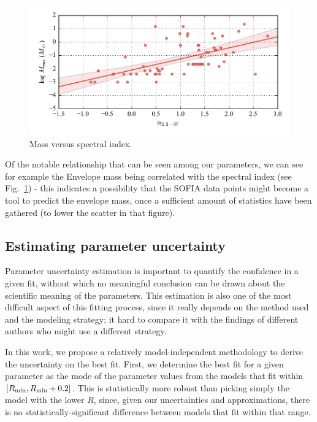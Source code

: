 \begin{figure}[!h]
\begin{center}
\includegraphics[width=\textwidth]{Figures/massVSalpha.pdf}
\vspace{-1cm}
\caption[Mass versus spectral index]{Mass versus spectral index.}
\label{fig:massVSalpha}
\end{center}
\end{figure}

Of the notable relationship that can be seen among our parameters, we can see for example the Envelope mass being correlated with the spectral index (see Fig.~\ref{fig:massVSalpha}) - this indicates a possibility that the SOFIA data points might become a tool to predict the envelope mass, once a sufficient amount of statistics have been gathered (to lower the scatter in that figure). 



\subsection{Estimating parameter uncertainty}

Parameter uncertainty estimation is important to quantify the confidence in a given fit, without which no meaningful conclusion can be drawn about the scientific meaning of the parameters. This estimation is also one of the most difficult aspect of this fitting process, since it really depends on the method used and the modeling strategy; it hard to compare it with the findings of different authors who might use a different strategy. 

In this work, we propose a relatively model-independent methodology to derive the uncertainty on the best fit. First, we determine the best fit for a given parameter as the mode of the parameter values from the models that fit within $[R_\textrm{min},R_\textrm{min}+0.2]$. This is statistically more robust than picking simply the model with the lower $R$, since, given our uncertainties and approximations, there is no statistically-significant difference between models that fit within that range.

